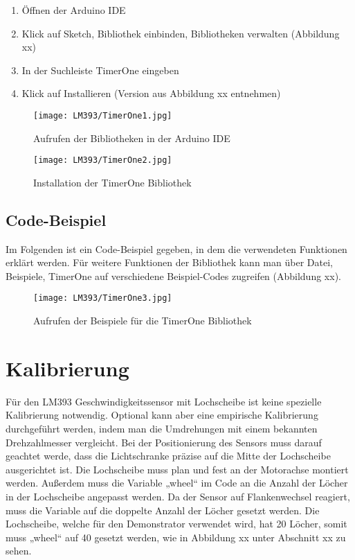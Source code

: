 \begin{enumerate}
	\item Öffnen der Arduino IDE
	\item Klick auf Sketch, Bibliothek einbinden, Bibliotheken verwalten (Abbildung xx)
	\item In der Suchleiste TimerOne eingeben
	\item Klick auf Installieren (Version aus Abbildung xx entnehmen)
\end{enumerate}

\begin{figure}[H]
	\centering
	\texttt{[image: LM393/TimerOne1.jpg]}
	\caption{Aufrufen der Bibliotheken in der Arduino IDE}
	\label{fig:BibTimerOne}
\end{figure}

\begin{figure}[H]
	\centering
	\texttt{[image: LM393/TimerOne2.jpg]}
	\caption{Installation der TimerOne Bibliothek}
	\label{fig:InstTimerOne}
\end{figure}

\subsection{Code-Beispiel}

Im Folgenden ist ein Code-Beispiel gegeben, in dem die verwendeten Funktionen erklärt werden. Für weitere Funktionen der Bibliothek kann man über Datei, Beispiele, TimerOne auf verschiedene Beispiel-Codes zugreifen (Abbildung xx).

\begin{figure}[H]
	\centering
	\texttt{[image: LM393/TimerOne3.jpg]}
	\caption{Aufrufen der Beispiele für die TimerOne Bibliothek}
	\label{fig:ExamplesTimerOne1}
\end{figure}

\section{Kalibrierung}

Für den LM393 Geschwindigkeitssensor mit Lochscheibe ist keine spezielle Kalibrierung notwendig. Optional kann aber eine empirische Kalibrierung durchgeführt werden, indem man die Umdrehungen mit einem bekannten Drehzahlmesser vergleicht. Bei der Positionierung des Sensors muss darauf geachtet werde, dass die Lichtschranke präzise auf die Mitte der Lochscheibe ausgerichtet ist. Die Lochscheibe muss plan und fest an der Motorachse montiert werden. Außerdem muss die Variable „wheel“ im Code an die Anzahl der Löcher in der Lochscheibe angepasst werden. Da der Sensor auf Flankenwechsel reagiert, muss die Variable auf die doppelte Anzahl der Löcher gesetzt werden. Die Lochscheibe, welche für den Demonstrator verwendet wird, hat 20 Löcher, somit muss „wheel“ auf 40 gesetzt werden, wie in Abbildung xx unter Abschnitt xx zu sehen. 

